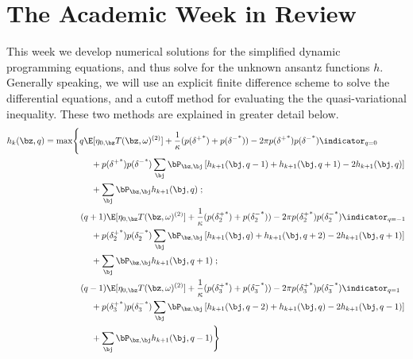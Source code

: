 \documentclass[12pt]{article}
\begin{document}
\section*{The Academic Week in Review}
This week we develop numerical solutions for the simplified dynamic programming equations, and thus solve for the unknown ansantz functions $h$. Generally speaking, we will use an explicit finite difference scheme to solve the differential equations, and a cutoff method for evaluating the the quasi-variational inequality. These two methods are explained in greater detail below.
\begin{equation}
\label{eq:discreteDPE}
\begin{split}
h_k(\bz,q) & = \max \Biggl\lbrace 
q\E[\eta_{0,\bz} T(\bz, \omega)^{(2)}] + \frac{1}{\kappa}(p({\delta^+}^*)+p({\delta^-}^*)) -2\pi p({\delta^+}^*)p({\delta^-}^*) \indicator_{q=0} \\ 
& \hphantom{{}={} \max \biggl\lbrace {}+{}} + p({\delta^+}^*)p({\delta^-}^*)\sum_\bj \bP_{\bz,\bj} \left[ h_{k+1}(\bj, q-1) + h_{k+1}(\bj, q+1) -2 h_{k+1}(\bj, q)  \right] \\
& \hphantom{{}={} \max \biggl\lbrace {}+{}} + \sum_{\bj} \bP_{\bz,\bj} h_{k+1}(\bj,q)  \; ;\\
& \hphantom{{}={} \max \biggl\lbrace} (q+1)\E[\eta_{0,\bz} T(\bz, \omega)^{(2)}] + \frac{1}{\kappa}(p({\delta_{2}^+}^*)+p({\delta_{2}^-}^*)) -2\pi p({\delta_{2}^+}^*)p({\delta_{2}^-}^*) \indicator_{q=-1} \\ 
& \hphantom{{}={} \max \biggl\lbrace {}+{}} + p({\delta_{2}^+}^*)p({\delta_{2}^-}^*)\sum_\bj \bP_{\bz,\bj} \left[ h_{k+1}(\bj, q) + h_{k+1}(\bj, q+2) -2 h_{k+1}(\bj, q+1)  \right] \\
& \hphantom{{}={} \max \biggl\lbrace {}+{}} + \sum_{\bj} \bP_{\bz,\bj} h_{k+1}(\bj,q+1) \; ;\\
& \hphantom{{}={} \max \biggl\lbrace} (q-1)\E[\eta_{0,\bz} T(\bz, \omega)^{(2)}] + \frac{1}{\kappa}(p({\delta_3^+}^*)+p({\delta_3^-}^*)) -2\pi p({\delta_3^+}^*)p({\delta_3^-}^*) \indicator_{q=1} \\ 
& \hphantom{{}={} \max \biggl\lbrace {}+{}} + p({\delta_3^+}^*)p({\delta_3^-}^*)\sum_\bj \bP_{\bz,\bj} \left[ h_{k+1}(\bj, q-2) + h_{k+1}(\bj, q) -2 h_{k+1}(\bj, q-1)  \right] \\
& \hphantom{{}={} \max \biggl\lbrace {}+{}} + \sum_{\bj} \bP_{\bz,\bj} h_{k+1}(\bj,q-1)  \Biggr\rbrace
\end{split}
\end{equation}
\end{document}
